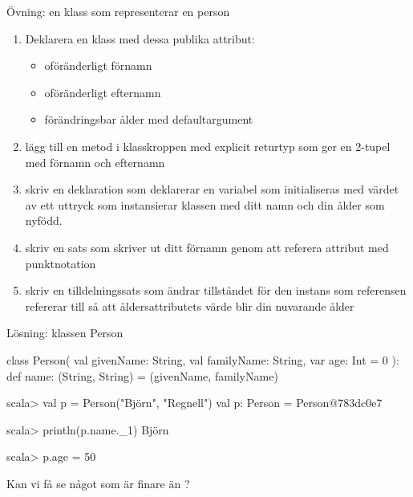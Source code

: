 \begin{Slide}{Övning: en klass som representerar en person}
\begin{enumerate}
  \item Deklarera en klass  med dessa publika attribut:
  \begin{itemize}
    \item oföränderligt förnamn
    \item oföränderligt efternamn
    \item förändringsbar ålder med defaultargument 
  \end{itemize}
  \item lägg till en metod i klasskroppen med explicit returtyp som ger en 2-tupel med förnamn och efternamn
  \item skriv en deklaration som deklarerar en variabel  som initialiseras med värdet av ett uttryck som instansierar klassen  med ditt namn och din ålder som nyfödd.
  \item skriv en sats som skriver ut ditt förnamn genom att referera attribut med punktnotation
  \item skriv en tilldelningssats som ändrar tillståndet för den instans som referensen  refererar till så att åldersattributets värde blir din nuvarande ålder
\end{enumerate}
\end{Slide}



\begin{Slide}{Lösning: klassen Person}
\begin{Code}[basicstyle=\SlideFontSize{6.9}{9}\ttfamily]
class Person(
  val givenName: String, 
  val familyName: String, 
  var age: Int = 0
):
  def name: (String, String) = (givenName, familyName)
\end{Code}
\begin{REPLnonum}[basicstyle=\SlideFontSize{7}{9}\ttfamily\color{white}]
scala> val p = Person("Björn", "Regnell")
val p: Person = Person@783dc0e7

scala> println(p.name._1)
Björn

scala> p.age = 50 

\end{REPLnonum}
Kan vi få se något som är finare än  ?
\end{Slide}


